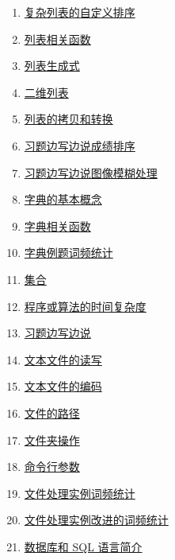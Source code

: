 \documentclass[11pt]{article}
\begin{document}
\begin{multicols}{2}
\begin{enumerate}
		\item  \href{https://mp.weixin.qq.com/s/k5OQ5MI5mzPw75ewlKdlMA}{复杂列表的自定义排序} %
		\item  \href{https://mp.weixin.qq.com/s/FOWcgm9ymYZ6Fpz_lr1ABA}{列表相关函数} %
		\item  \href{https://mp.weixin.qq.com/s/gFNdnU5O8UAWR4ItancMng}{列表生成式} %
		\item  \href{https://mp.weixin.qq.com/s/UQZc4eujewLdSTbHO_UE4w}{二维列表} %
		\item  \href{https://mp.weixin.qq.com/s/-4H1T1ZQCtuKuuXRk7zT9w}{列表的拷贝和转换} %
		\item  \href{https://mp.weixin.qq.com/s/-sNvaDJlOUQynkPU5iokrg}{习题边写边说成绩排序} %
		\item  \href{https://mp.weixin.qq.com/s/v04Lh17sjbtlweXiRCzT9g}{习题边写边说图像模糊处理} %
		\item  \href{https://mp.weixin.qq.com/s/KivWt2ylcVOkL_Xoseyeig}{字典的基本概念} %
		\item  \href{https://mp.weixin.qq.com/s/VuqSobuKbjyEODUSQI4iPg}{字典相关函数} %
		\item  \href{https://mp.weixin.qq.com/s/XXseo2_1mANoCQr_VrEXpA}{字典例题词频统计} %
		\item  \href{https://mp.weixin.qq.com/s/3ZbBQPHiqwNz98QbY5dukg}{集合} %
		\item  \href{https://mp.weixin.qq.com/s/DtuCJHcpyl-tbVhsKg_XnQ}{程序或算法的时间复杂度} %
		\item  \href{https://mp.weixin.qq.com/s/TogkD_6CVMnmcjubcML52w}{习题边写边说} %
		\item  \href{https://mp.weixin.qq.com/s/O10wCg-hX8lY_9G6MopwAA}{文本文件的读写} %
		\item  \href{https://mp.weixin.qq.com/s/vozMDqSMFGQ5BnfGj9Cl0w}{文本文件的编码} %
		\item  \href{https://mp.weixin.qq.com/s/oPL5z9BRQUzfFXuWRl-ckg}{文件的路径} %
		\item  \href{https://mp.weixin.qq.com/s/z_ZsrTpMmQl3fTaJfS1BYw}{文件夹操作} %
		\item  \href{https://mp.weixin.qq.com/s/eJcp7nbsli5dgkdcdqyYWg}{命令行参数} %
		\item  \href{https://mp.weixin.qq.com/s/kRgnvP3oUxKzXPMP4nvgog}{文件处理实例词频统计} %
		\item  \href{https://mp.weixin.qq.com/s/5w2ZYyM0SO96mwB8vI3lRA}{文件处理实例改进的词频统计} %
		\item  \href{https://mp.weixin.qq.com/s/AjqpxFr4XaKHoHiw2dGVUg}{数据库和 SQL 语言简介} %

\end{enumerate}
\end{multicols}
\end{document}

